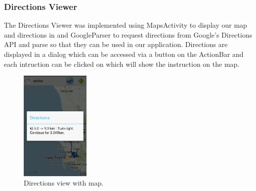 \subsubsection{Directions Viewer}
The Directions Viewer was implemented using MapsActivity to display our map
and directions in and GoogleParser to request directions from Google's
Directions API and parse so that they can be used in our application. Directions
are displayed in a dialog which can be accessed via a button on the ActionBar
and each intruction can be clicked on which will show the instruction on the
map. 
\begin{figure}[h!]
\centering
\includegraphics[width=0.3\textwidth]{directions.png}
\caption{Directions view with map.}
\end{figure}